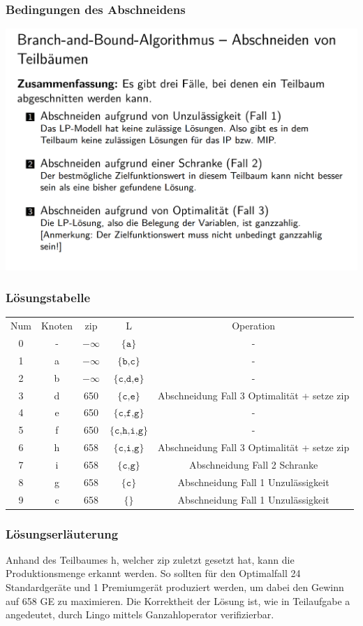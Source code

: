 \documentclass[a4paper,11pt]{article}
\begin{document}
\subsubsection*{Bedingungen des Abschneidens}
\begin{centering}
	\includegraphics[width=0.65\linewidth]{src/blatt_5_aufgabe_2_fallunterscheidung_abschneiden.png}
\end{centering}

\subsubsection*{Lösungstabelle}
    \begin{tabular}{ c c c c c }
        Num & Knoten & zip & L & Operation \\
        0 & - & $-\infty$ & $\texttt{\{a\}}$ & - \\
        1 & a & $-\infty$ & $\texttt{\{b,c\}}$ & - \\
        2 & b & $-\infty$ & $\texttt{\{c,d,e\}}$ & - \\
        3 & d & 650 & $\texttt{\{c,e\}}$ & Abschneidung Fall 3 Optimalität + setze zip \\
        4 & e & 650 & $\texttt{\{c,f,g\}}$ & - \\
        5 & f & 650 & $\texttt{\{c,h,i,g\}}$ & - \\
        6 & h & 658 & $\texttt{\{c,i,g\}}$  & Abschneidung Fall 3 Optimalität + setze zip \\
        7 & i & 658 & $\texttt{\{c,g\}}$ & Abschneidung Fall 2 Schranke \\
        8 & g & 658 & $\texttt{\{c\}}$ & Abschneidung Fall 1 Unzulässigkeit \\
        9 & c & 658 & $\texttt{\{\}}$ & Abschneidung Fall 1 Unzulässigkeit \\
    \end{tabular}

\subsubsection*{Lösungserläuterung}
Anhand des Teilbaumes h, welcher zip zuletzt gesetzt hat, kann die Produktionsmenge erkannt werden. So sollten für den Optimalfall 24 Standardgeräte und 1 Premiumgerät produziert werden, um dabei den Gewinn auf 658 GE zu maximieren. Die Korrektheit der Lösung ist, wie in Teilaufgabe a angedeutet, durch Lingo mittels Ganzahloperator verifizierbar.
\end{document}
